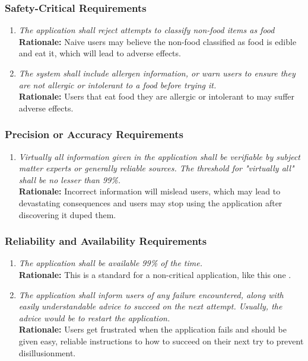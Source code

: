 \documentclass[]{article}
\begin{document}
\subsubsection{Safety-Critical Requirements}
\label{ssub:safety_critical_requirements}
\begin{enumerate}[{PR-SC}1. ]
	\item \textit{The application shall reject attempts to classify non-food items as food} \\ \textbf{Rationale:} Naive users may believe the non-food classified as food is edible and eat it, which will lead to adverse effects.
    \item \textit{The system shall include allergen information, or warn users to ensure they are not allergic or intolerant to a food before trying it.} \\ \textbf{Rationale:} Users that eat food they are allergic or intolerant to may suffer adverse effects.
\end{enumerate}

\subsubsection{Precision or Accuracy Requirements}
\label{ssub:precision_or_accuracy_requirements}
\begin{enumerate}[{PR-PA}1. ]
	\item \textit{Virtually all information given in the application shall be verifiable by subject matter experts or generally reliable sources. The threshold for "virtually all" shall be no lesser than 99\%.} \\ \textbf{Rationale:} Incorrect information will mislead users, which may lead to devastating consequences and users may stop using the application after discovering it duped them.
\end{enumerate}

\subsubsection{Reliability and Availability Requirements}
\label{ssub:reliability_and_availability_requirements}
\begin{enumerate}[{PR-RA}1. ]
	\item \textit{The application shall be available 99\% of the time.} \\ \textbf{Rationale:} This is a standard for a non-critical application, like this one \cite{ConcreteCMS}.
    \item \textit{The application shall inform users of any failure encountered, along with easily understandable advice to succeed on the next attempt. Usually, the advice would be to restart the application.} \\ \textbf{Rationale:} Users get frustrated when the application fails and should be given easy, reliable instructions to how to succeed on their next try to prevent disillusionment.
\end{enumerate}
\end{document}

